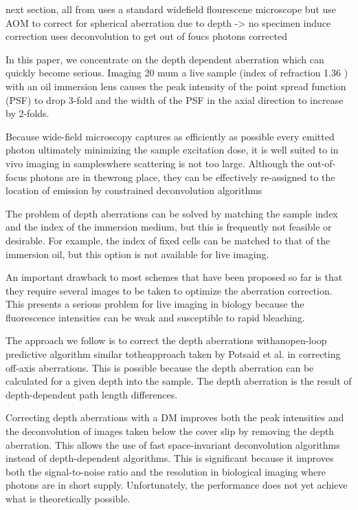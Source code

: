 next section, all from \cite{wide_AOM_FM_spehrical_correction} uses a 
standard widefield flourescene microscope but use AOM to correct for 
spherical aberration due to depth -> no specimen induce correction
uses deconvolution to get out of foucs photons corrected

In this paper, we concentrate on the depth dependent aberration which can 
quickly become serious. Imaging 20 mum a live sample (index of refraction 1.36
) with an oil immersion lens causes the peak intensity of the point spread 
function (PSF) to drop 3-fold and the width of the PSF in the axial direction 
to increase by 2-folds. \cite{wide_AOM_FM_spehrical_correction} 

Because wide-field microscopy captures as efficiently as possible every 
emitted photon ultimately minimizing the sample excitation dose, it is well 
suited to in vivo imaging in sampleswhere scattering is not too large. 
Although the out-of-focus photons are in thewrong place, they can be 
effectively re-assigned to the location of emission by constrained 
deconvolution algorithms \cite{wide_deconvolution}

The problem of depth aberrations can be solved by matching the sample index 
and the index of the immersion medium, but this is frequently not feasible or 
desirable. For example, the index of fixed cells can be matched to that of 
the immersion oil, but this option is not available for live imaging.

An important drawback to most schemes that have been proposed so far is that 
they require several images to be taken to optimize the aberration 
correction. This presents a serious problem for live imaging in biology 
because the fluorescence intensities can be weak and susceptible to rapid 
bleaching.

The approach we follow is to correct the depth aberrations withanopen-loop 
predictive algorithm similar totheapproach taken by Potsaid et al. in 
correcting off-axis aberrations. This is possible because the depth 
aberration can be calculated for a given depth into the sample. The depth 
aberration is the result of depth-dependent path length differences.

Correcting depth aberrations with a DM improves both the peak intensities and 
the deconvolution of images taken below the cover slip by removing the depth 
aberration. This allows the use of fast space-invariant deconvolution 
algorithms instead of depth-dependent algorithms. This is significant because 
it improves both the signal-to-noise ratio and the resolution in biological 
imaging where photons are in short supply. Unfortunately, the performance 
does not yet achieve what is theoretically possible.

